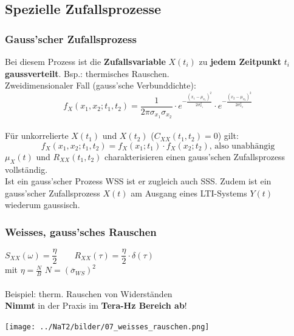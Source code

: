 \subsection{Spezielle Zufallsprozesse }
\subsubsection{Gauss'scher Zufallsprozess}
Bei diesem Prozess ist die \textbf{Zufallsvariable} $X(t_{i})$ zu \textbf{jedem Zeitpunkt} $t_{i}$
\textbf{gaussverteilt}. Bsp.: thermisches Rauschen. \\
Zweidimensionaler Fall (gauss'sche Verbunddichte): 
       $$f_{X}(x_{1},x_{2};t_{1},t_{2}) = \frac{1}{2\pi \sigma_{x_{1}}\sigma_{x_{2}}} \cdot
                                      e^{-\frac{(x_{1}-\mu_{x_{1}})^{2}}{2 \sigma^{2}_{x_{1}}}} \cdot
                                      e^{-\frac{(x_{2}-\mu_{x_{2}})^{2}}{2 \sigma^{2}_{x_{2}}}}$$ \\
Für unkorrelierte $X(t_{1})$ und $X(t_{2})$  ($C_{XX}(t_{1},t_{2})=0$) gilt:
        $$f_{X}(x_{1},x_{2}; t_{1},t_{2}) = f_{X}(x_{1};t_{1}) \cdot f_{X}(x_{2};t_{2}) \text{, also unabhängig} $$
$\mu_{X}(t)$ und $R_{XX}(t_{1}, t_{2})$ charakterisieren einen gauss'schen Zufallsprozess
        vollst\"andig. \\
Ist ein gauss'scher Prozess WSS ist er zugleich auch SSS. Zudem ist ein gauss'scher
Zufallsprozess $X(t)$ am Ausgang eines LTI-Systems $Y(t)$ wiederum gaussisch.

\subsubsection{Weisses, gauss'sches Rauschen}
\begin{center}
	\begin{minipage}{8cm}
		$S_{XX}(\omega) = \dfrac{\eta}{2} \qquad R_{XX}(\tau) = \dfrac{\eta}{2} \cdot \delta(\tau)$ \\ mit $\eta = \frac{N}{B}$ \qquad $N = (\overline{\sigma}_{WS})^2$\\ \\
		Beispiel: therm. Rauschen von Widerständen \\
		\textbf{Nimmt} in der Praxis im \textbf{Tera-Hz Bereich ab}!
  	\end{minipage}
	\begin{minipage}{10cm}
		\texttt{[image: ../NaT2/bilder/07\_weisses\_rauschen.png]}
  	\end{minipage}
\end{center}

